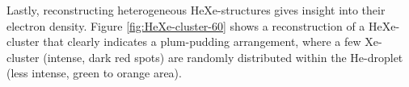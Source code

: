 Lastly, reconstructing heterogeneous HeXe-structures gives insight into their electron density. Figure \ref{fig:HeXe-cluster-60} shows a reconstruction of a HeXe-cluster that clearly indicates a plum-pudding arrangement, where a few Xe-cluster (intense, dark red spots) are randomly distributed within the He-droplet (less intense, green to orange area).
%
%
%
%
%
%
